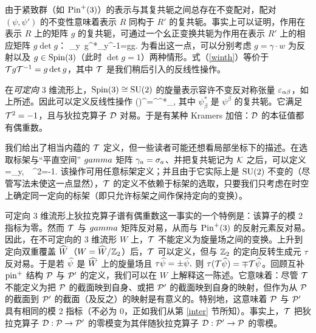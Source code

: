 由于紧致群（如 $\Pin^+(3)$）的表示与其复共轭之间总存在不变配对，配对 $(\psi,\psi')$ 的不变性意味着表示 $R$ 同构于 $R'$ 的复共轭。事实上可以证明，作用在表示 $R$ 上的矩阵 $g$ 的复共轭，可通过一个幺正变换共轭为作用在表示 $R'$ 上的相应矩阵 $g\det g$：
\be\label{winth}\sigma_y \,g^*\sigma_y^{-1}=g\det g. \ee
为看出这一点，可以分别考虑 $g=\gamma\cdot w$ 为反射以及 $g\in \Spin(3)$（此时 $\det g=1$）两种情形。式（\ref{winth}）等价于 $\T g\T^{-1}=g\det g$，其中 $\T$ 是我们稍后引入的反线性操作。


在{\it 可定向} 3 维流形上，$\Spin(3)\cong \SU(2)$ 的旋量表示容许不变反对称张量 $\veps_{\alpha\beta}$，如上所述。因此可以定义反线性操作
\be\label{tork} (\T\psi)^\alpha=\veps^{\alpha\beta}\psi^*_\beta,\ee
其中 $\psi^*_\beta$ 是 $\psi^\beta$ 的复共轭。它满足 $\T^2=-1$，且与狄拉克算子 $\D$ 对易。于是有某种 Kramers 加倍：$\D$ 的本征值都有偶重数。

我们给出了相当内蕴的 $\T$ 定义，但一些读者可能还想看局部坐标下的描述。在选取标架与“平直空间” $\\gamma$ 矩阵 $\g_a=\sigma_a$、并把复共轭记为 $\K$ 之后，可以定义
\be\label{zork} \T=\K \sigma_y,~~\T^2=-1.\ee
该操作可用任意标架定义；并且由于它实际上是 $\SU(2)$ 不变的（尽管写法未使这一点显然），$\T$ 的定义不依赖于标架的选取，只要我们只考虑在时空上确定同一定向的标架（即只允许标架之间作保持定向的变换）。


可定向 3 维流形上狄拉克算子谱有偶重数这一事实的一个特例是：该算子的模 2 指标为零。然而 $\T$ 与 $\\gamma$ 矩阵反对易，从而与 $\Pin^+(3)$ 的反射元素反对易。因此，在不可定向的 3 维流形 $W$ 上，$\T$ 不能定义为旋量场之间的变换。上升到定向双重覆盖 $\h W$（$W=\h W/\Z_2$）后，$\T$ 可以定义，但与 $\Z_2$ 的定向反转生成元 $\tau$ 反对易。于是若 $\h\psi$ 是 $\h W$ 上的旋量场且 $\tau\h\psi=\pm \h\psi,$ 则 $\tau(\T\h\psi)=\mp \T\h\psi$。回顾互补 $\pin^+$ 结构 $\P$ 与 $\P'$ 的定义，我们可以在 $W$ 上解释这一陈述。它意味着：尽管 $\T$ 不能定义为把 $\P$ 的截面映到自身、或把 $\P'$ 的截面映到自身的映射，但作为从 $\P$ 的截面到 $\P'$ 的截面（及反之）的映射是有意义的。特别地，这意味着 $\P$ 与 $\P'$ 具有相同的模 2 指标（不必为 0，正如我们从第 \ref{inter} 节所知）。事实上，$\T$ 把狄拉克算子 $\D:\P\to \P'$ 的零模变为其伴随狄拉克算子 $\D:\P'\to\P$ 的零模。

